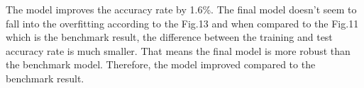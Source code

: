 
The model improves the accuracy rate by 1.6\%. The final model doesn't seem to fall into the overfitting according to the Fig.13 and when compared to the Fig.11 which is the benchmark result, the difference between the training and test accuracy rate is much smaller. That means the final model is more robust than the benchmark model. Therefore, the model improved compared to the benchmark result.




